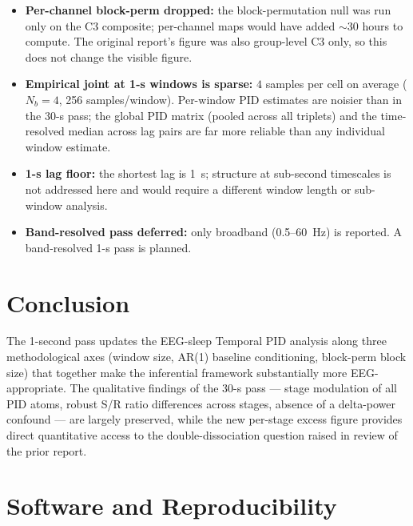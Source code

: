 \documentclass[11pt,a4paper]{article}
\begin{document}
\begin{itemize}
  \item \textbf{Per-channel block-perm dropped:} the block-permutation null
    was run only on the C3 composite; per-channel maps would have added
    $\sim$30 hours to compute.  The original report's figure was also
    group-level C3 only, so this does not change the visible figure.

  \item \textbf{Empirical joint at 1-s windows is sparse:} $4$ samples per
    cell on average ($N_b = 4$, 256 samples/window).  Per-window PID
    estimates are noisier than in the 30-s pass; the global PID matrix
    (pooled across all triplets) and the time-resolved median across lag
    pairs are far more reliable than any individual window estimate.

  \item \textbf{1-s lag floor:} the shortest lag is 1~s; structure at
    sub-second timescales is not addressed here and would require a
    different window length or sub-window analysis.

  \item \textbf{Band-resolved pass deferred:} only broadband
    (0.5--60~Hz) is reported.  A band-resolved 1-s pass is planned.
\end{itemize}

\section{Conclusion}

The 1-second pass updates the EEG-sleep Temporal PID analysis along three
methodological axes (window size, AR(1) baseline conditioning, block-perm
block size) that together make the inferential framework substantially
more EEG-appropriate.  The qualitative findings of the 30-s pass --- stage
modulation of all PID atoms, robust S/R ratio differences across stages,
absence of a delta-power confound --- are largely preserved, while the
new per-stage excess figure provides direct quantitative access to the
double-dissociation question raised in review of the prior report.

\section*{Software and Reproducibility}
\end{document}
